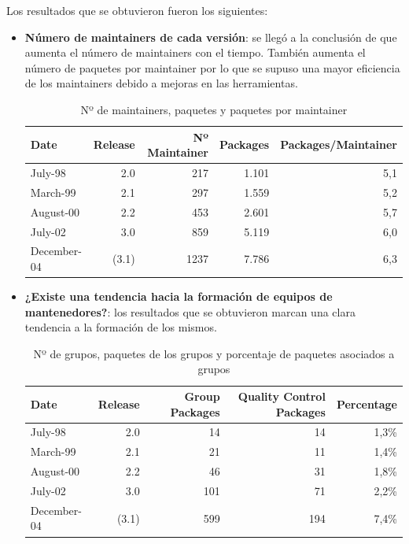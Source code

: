 \documentclass[a4paper, 12pt]{book}
\begin{document}
Los resultados que se obtuvieron fueron los siguientes:
\begin{itemize}
	\item \textbf {Número de maintainers de cada versión}: se llegó a la conclusión de que aumenta el número de maintainers con el tiempo. También aumenta el número de paquetes por maintainer por lo que se supuso una mayor eficiencia de los maintainers debido a mejoras en las herramientas.
	
	\begin{table}[]
		\begin{tabular}{|l|r|r|r|r|}
			\hline
			Date        & Release & Nº Maintainer & Packages & Packages/Maintainer \\ \hline
			July-98     & 2.0     & 217           & 1.101    & 5,1                 \\ \hline
			March-99    & 2.1     & 297           & 1.559    & 5,2                 \\ \hline
			August-00   & 2.2     & 453           & 2.601    & 5,7                 \\ \hline
			July-02     & 3.0     & 859           & 5.119    & 6,0                 \\ \hline
			December-04 & (3.1)   & 1237          & 7.786    & 6,3                 \\ \hline
		\end{tabular}
		\caption{Nº de maintainers, paquetes y paquetes por maintainer}
	\end{table}
	
	\item \textbf {¿Existe una tendencia hacia la formación de equipos de 
	mantenedores?}: los resultados que se obtuvieron marcan una clara tendencia a la formación de los mismos.
	
	\begin{table}[h]
		\begin{tabular}{|l|r|r|r|r|}
			\hline
			Date        & Release & Group Packages & Quality Control Packages & Percentage \\ \hline
			July-98     & 2.0     & 14             & 14                       & 1,3\%      \\ \hline
			March-99    & 2.1     & 21             & 11                       & 1,4\%      \\ \hline
			August-00   & 2.2     & 46             & 31                       & 1,8\%      \\ \hline
			July-02     & 3.0     & 101            & 71                       & 2,2\%      \\ \hline
			December-04 & (3.1)   & 599            & 194                      & 7,4\%      \\ \hline
		\end{tabular}
		\caption{Nº de grupos, paquetes de los grupos y porcentaje de paquetes asociados a grupos}
	\end{table}
	

\end{itemize}
\end{document}
